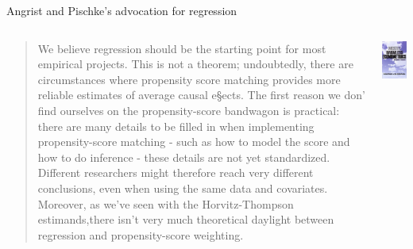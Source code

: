 \documentclass[notes,11pt, aspectratio=169]{beamer}
\begin{document}
\begin{frame}{Angrist and Pischke's advocation for regression}
\begin{columns}[T] %
  \begin{column}{.65\textwidth}
    \begin{quote}
      We believe regression should be the starting point for most empirical projects. This is not a theorem; undoubtedly, there are circumstances where propensity score matching provides more reliable estimates of average causal e§ects. The first reason we don' find ourselves on the propensity-score bandwagon is practical: there are many details to be filled in when implementing propensity-score matching - such as how to model the score and how to do inference - these details are not yet standardized. Different researchers might therefore reach very different conclusions, even when using the same data and covariates. Moreover, as we've seen with the Horvitz-Thompson estimands,there isn't very much theoretical daylight between regression and propensity-score weighting.
      \end{quote}
\end{column}%
\hfill%
\begin{column}{.35\textwidth}
\includegraphics[width=\linewidth]{images/mhe.jpg}
\end{column}%
\end{columns}
\end{frame}
\end{document}
